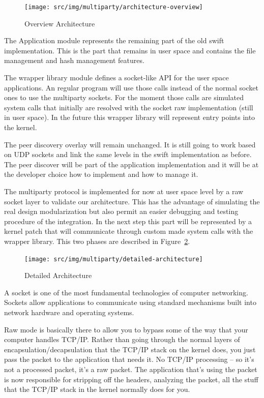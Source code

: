 \begin{figure}
  \centering
  \texttt{[image: src/img/multiparty/architecture-overview]}
  \caption{Overview Architecture}
  \label{fig:multiparty:architecture-overview}
\end{figure}

The Application module represents the remaining part of the old swift
implementation. This is the part that remains in user space and contains the
file management and hash management features. 

The wrapper library module defines a socket-like API for the user space
applications. An regular program will use those calls instead of the normal
socket ones to use the multiparty sockets. For the moment those calls are
simulated system calls that initially are resolved with the socket raw
implementation (still in user space). In the future this wrapper library
will represent entry points into the kernel.

The peer discovery overlay will remain unchanged. It is still going to work
based on UDP sockets and link the same levels in the swift implementation as
before. The peer discover will be part of the application implementation and
it will be at the developer choice how to implement and how to manage it.

The multiparty protocol is implemented for now at user space level by a raw
socket layer to validate our architecture.  This has the advantage of
simulating the real design modularization but also permit an easier debugging
and testing procedure of the integration. In the next step this part will be
represented by a kernel patch that will communicate through custom made system
calls with the wrapper library. This two phases are described in
Figure~\ref{fig:multiparty:detailed-architecture}.

\begin{figure}
  \centering
  \texttt{[image: src/img/multiparty/detailed-architecture]}
  \caption{Detailed Architecture}
  \label{fig:multiparty:detailed-architecture}
\end{figure}

A socket is one of the most fundamental technologies of computer networking.
Sockets allow applications to communicate using standard mechanisms built into
network hardware and operating systems.

Raw mode is basically there to allow you to bypass some of the way that your
computer handles TCP/IP. Rather than going through the normal layers of
encapsulation/decapsulation that the TCP/IP stack on the kernel does, you just
pass the packet to the application that needs it. No TCP/IP processing -- so
it's not a processed packet, it's a raw packet. The application that's using
the packet is now responsible for stripping off the headers, analyzing the
packet, all the stuff that the TCP/IP stack in the kernel normally does for
you.

